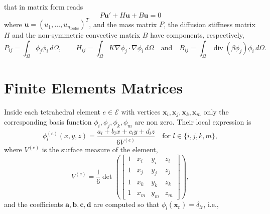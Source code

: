 \documentclass[hidelinks]{article}
\DeclareMathOperator{\divg}{div}
\begin{document}
that in matrix form reads \[ P\mathbf{u}' + H\mathbf{u} + B\mathbf{u} = 0\] where $\mathbf{u} = (u_1, \dots, u_{n_\text{nodes}})^T$, and the mass matrix $P$, the diffusion stiffness matrix $H$ and the non-symmetric convective matrix $B$ have components, respectively,
\[P_{ij} = \int_\Omega \phi_j \phi_i\, d\Omega ,\quad\quad H_{ij} = \int_\Omega K \nabla \phi_j \cdot \nabla \phi_i\, d\Omega \quad \text{and} \quad B_{ij} = \int_\Omega  \divg( \beta \phi_j) \phi_i\,d\Omega.\]

\section{Finite Elements Matrices}

Inside each tetrahedral element $e\in\mathcal{E}$ with vertices $\mathbf{x}_i, \mathbf{x}_j, \mathbf{x}_k, \mathbf{x}_m$ only the corresponding basis function $\phi_i,\phi_j,\phi_k,\phi_m$ are non zero. Their local expression is 
\[
\phi_l^{(e)} (x,y,z)= \frac{a_l + b_l x + c_l y + d_l z}{6V^{(e)}} \quad \text{for } l \in \{i,j,k,m\},
\]
where $V^{(e)}$ is the surface measure of the element,
\[
V^{(e)} = \frac{1}{6}\det \left(\begin{bmatrix}
    1 & x_i & y_i & z_i \\ 1 & x_j & y_j & z_j\\ 1 & x_k & y_k & z_k \\ 1 & x_m & y_m & z_m
\end{bmatrix} \right),
\]
and the coefficients $\mathbf{a}, \mathbf{b}, \mathbf{c}, \mathbf{d}$ are computed so that $\phi_l(\mathbf{x_r}) = \delta_{lr}$, i.e., 
\end{document}
